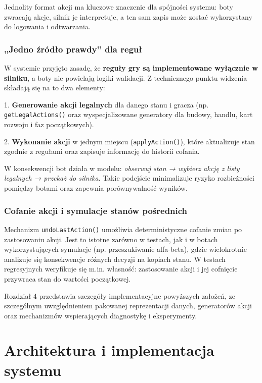 \documentclass[polish,inz,longabstract]{iithesis}
\begin{document}
Jednolity format akcji ma kluczowe znaczenie dla spójności systemu: boty zwracają akcje, silnik je interpretuje, a ten sam zapis może zostać wykorzystany do logowania i odtwarzania.

\subsection{„Jedno źródło prawdy” dla reguł}

W systemie przyjęto zasadę, że \textbf{reguły gry są implementowane wyłącznie w silniku}, a boty nie powielają logiki walidacji. Z technicznego punktu widzenia składają się na to dwa elementy:

1. \textbf{Generowanie akcji legalnych} dla danego stanu i gracza \newline (np. \texttt{getLegalActions()} oraz wyspecjalizowane generatory dla budowy, handlu, kart rozwoju i faz początkowych).

2. \textbf{Wykonanie akcji} w jednym miejscu (\texttt{applyAction()}), które aktualizuje stan zgodnie z regułami oraz zapisuje informację do historii cofania.

W konsekwencji bot działa w modelu: \textit{obserwuj stan → wybierz akcję z listy legalnych → przekaż do silnika}. Takie podejście minimalizuje ryzyko rozbieżności pomiędzy botami oraz zapewnia porównywalność wyników.

\subsection{Cofanie akcji i symulacje stanów pośrednich}

Mechanizm \texttt{undoLastAction()} umożliwia deterministyczne cofanie zmian po zastosowaniu akcji. Jest to istotne zarówno w testach, jak i w botach wykorzystujących symulacje (np. przeszukiwanie alfa-beta), gdzie wielokrotnie analizuje się konsekwencje różnych decyzji na kopiach stanu. W testach regresyjnych weryfikuje się m.in. własność: zastosowanie akcji i jej cofnięcie przywraca stan do wartości początkowej.

Rozdział 4 przedstawia szczegóły implementacyjne powyższych założeń, ze szczególnym uwzględnieniem pakowanej reprezentacji danych, generatorów akcji oraz mechanizmów wspierających diagnostykę i eksperymenty.


\chapter{Architektura i implementacja systemu}
\end{document}
